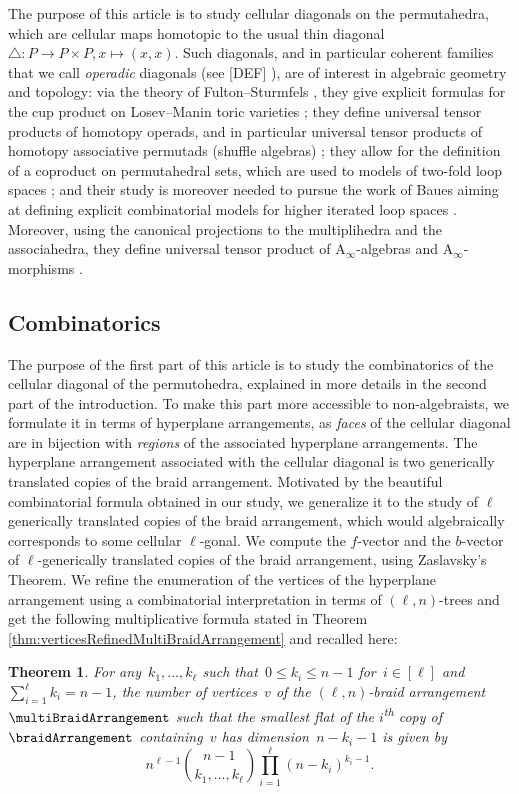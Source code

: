 \documentclass{amsart}
\newcommand{\Guillaume}[1]{\todo[color=magenta!30]{\rm #1 \\ \hfill --- G.}}
\newcommand{\BDO}[1]{\todo[color=green!30]{\rm #1 \\ \hfill --- B.}}
\newtheorem*{theorem*}{Theorem}
\theoremstyle{definition}
\newcommand{\ordinal}{\textsuperscript{th}} %
\newcommand{\Ainf}{\ensuremath{\mathrm{A}_\infty}}
\begin{document}
The purpose of this article is to study cellular diagonals on the permutahedra, which are cellular maps homotopic to the usual thin diagonal $\triangle : P \to P \times P, x \mapsto (x,x)$.
Such diagonals, and in particular coherent families that we call \emph{operadic} diagonals (see [DEF] \BDO{Reference ?}), are of interest in algebraic geometry and topology: via the theory of Fulton--Sturmfels \cite{fultonIntersectionTheoryToric1997a}, they give explicit formulas for the cup product on Losev--Manin toric varieties \cite{losevNewModuliSpaces2000}; they define universal tensor products of homotopy operads, and in particular universal tensor products of homotopy associative permutads (shuffle algebras) \cite{LA21}; they allow for the definition of a coproduct on permutahedral sets, which are used to models of two-fold loop spaces \cite{SaneblidzeUmble04}; and their study is moreover needed to pursue the work of Baues aiming at defining explicit combinatorial models for higher iterated loop spaces \cite{bauesGeometryLoopSpaces1980}. 
Moreover, using the canonical projections to the multiplihedra and the associahedra, they define universal tensor product of $\Ainf$-algebras and $\Ainf$-morphisms \cite{MazuirLA22}.
\Guillaume{lien avec les matroides?}


\subsection*{Combinatorics}

The purpose of the first part of this article is to study the combinatorics of the cellular diagonal of the permutohedra, explained in more details in the second part of the introduction.
 To make this part more accessible to non-algebraists, we formulate it in terms of hyperplane arrangements, as \emph{faces} of the cellular diagonal are in bijection with \emph{regions} of the associated hyperplane arrangements. 
 The hyperplane arrangement associated with  the cellular diagonal is two generically translated copies of the braid arrangement. 
 Motivated by the beautiful combinatorial formula obtained in our study, we generalize it to the study of $\ell$ generically translated copies of the braid arrangement, which would algebraically corresponds to some cellular $\ell$-gonal.
  We compute the $f$-vector and the $b$-vector of $\ell$-generically translated copies of the braid arrangement, using Zaslavsky's Theorem. 
  We refine the enumeration of the vertices of the hyperplane arrangement using a combinatorial interpretation in terms of $(\ell, n)$-trees and get the following multiplicative formula stated in Theorem \ref{thm:verticesRefinedMultiBraidArrangement} and recalled here:
\begin{theorem*}
For any~$k_1, \dots, k_\ell$ such that~$0 \le k_i \le n-1$ for~$i \in [\ell]$ and~${\sum_{i=1}^\ell k_i = n-1}$, the number of vertices~$v$ of the $(\ell,n)$-braid arrangement~$\multiBraidArrangement$ such that the smallest flat of the $i$\ordinal{} copy of~$\braidArrangement$ containing~$v$ has dimension~$n-k_i-1$ is given by
\[
n^{\ell-1} \binom{n-1}{k_1, \dots, k_\ell} \prod_{i=1}^\ell (n-k_i)^{k_i-1}.
\]
\end{theorem*}
\end{document}
